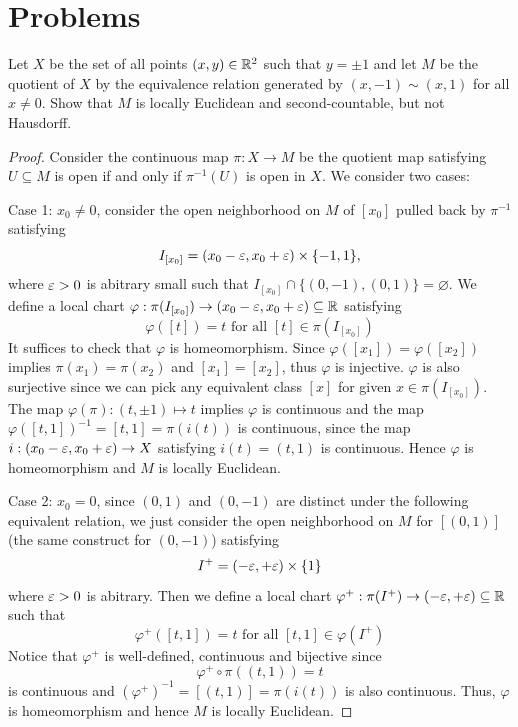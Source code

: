 \section{Problems}
\begin{problem}
    Let $X$ be the set of all points $(x,y) \in \mathbb{R}^2$ such that $y = \pm 1$ and let $M$ be the quotient of $X$ by the equivalence relation generated by $(x,-1) \sim (x,1)$ for all $x \neq 0$. Show that $M$ is locally Euclidean and second-countable, but not Hausdorff.
\end{problem}
\begin{proof}
    Consider the continuous map $\pi: X \to M$ be the quotient map satisfying $U \subseteq M$ is open if and only if $\pi^{-1}(U)$ is open in $X$. We consider two cases:
    
    Case 1: $x_0 \neq 0$, consider the open neighborhood on $M$ of $[x_0]$ pulled back by $\pi^{-1}$ satisfying
    \[
        I_{[x_0]} = (x_0 - \varepsilon, x_0 + \varepsilon)\times\{-1,1\},
    \]
    where $\varepsilon > 0$ is abitrary small such that $I_{[x_0]} \cap \{(0,-1),(0,1)\} = \varnothing$. We define a local chart $\varphi: \pi(I_{[x_0]}) \to (x_0 - \varepsilon, x_0 + \varepsilon) \subseteq \mathbb{R}$ satisfying
    \[
        \varphi([t]) = t \text{ for all }[t] \in \pi(I_{[x_0]})
    \]
    It suffices to check that $\varphi$ is homeomorphism. Since $\varphi([x_1]) = \varphi([x_2])$ implies $\pi(x_1) = \pi(x_2)$ and $[x_1] = [x_2]$, thus $\varphi$ is injective.
    $\varphi$ is also surjective since we can pick any equivalent class $[x]$ for given $x \in \pi(I_{[x_0]})$. The map $\varphi(\pi): (t, \pm 1) \mapsto t$ implies $\varphi$ is  continuous and the map $\varphi([t,1])^{-1} = [t,1] = \pi(i(t))$ is continuous, since the map $i: (x_0 - \varepsilon, x_0 + \varepsilon) \to X$ satisfying $i(t) = (t,1)$ is continuous.
    Hence $\varphi$ is homeomorphism and $M$ is locally Euclidean.


    Case 2: $x_0 = 0$, since $(0,1)$ and $(0,-1)$ are distinct under the following equivalent relation, we just consider the open neighborhood on $M$ for $[(0,1)]$ (the same construct for $(0,-1)$) satisfying 
    \[
        I^+ = (-\varepsilon,+\varepsilon) \times \{1\}
    \]
    where $\varepsilon > 0$ is abitrary. Then we define a local chart $\varphi^+: \pi(I^+) \to (-\varepsilon, +\varepsilon) \subseteq \mathbb{R}$ such that 
    \[
        \varphi^+([t,1]) = t \text{ for all } [t,1] \in \varphi(I^+)
    \]
    Notice that $\varphi^+$ is well-defined, continuous and bijective since 
    \[
        \varphi^+\circ \pi((t,1)) = t
    \]
    is continuous and $(\varphi^+)^{-1} = [(t,1)] = \pi(i(t))$ is also continuous. Thus, $\varphi$ is homeomorphism and hence $M$ is locally Euclidean.


\end{proof}
